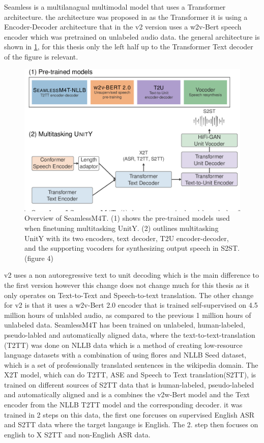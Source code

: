 Seamless is a multilanagual multimodal model that uses a Transformer architecture. 
the architecture was proposed in \cite{seamless2023}
as the Transformer it is using a Encoder-Decoder architecture that in the v2 version uses a w2v-Bert speech encoder which was pretrained on unlabeled audio data. 
the general architecture is shown in \ref{fig:seamlessmodel}, for this thesis only the left half up to the Transformer Text decoder of the figure is relevant. 

\begin{figure}
        \centering
        \includegraphics[width=0.5\linewidth]{Latex//sections/images/seamlessmodel.png}
        \caption{Overview of SeamlessM4T. (1) shows the pre-trained models used when finetuning multitasking UnitY. (2) outlines multitasking UnitY with its two encoders, text decoder, T2U encoder-decoder, and the supporting vocoders for synthesizing output speech in S2ST. \cite{seamless2023}(figure 4)}
        \label{fig:seamlessmodel}
\end{figure}
    
v2 uses a non autoregressive text to unit decoding which is the main difference to the first version however this change does not change much for this thesis as it only operates on Text-to-Text and Speech-to-text translation. 
The other change for v2 is that it uses a w2v-Bert 2.0 \cite{chung2021w2vbertcombiningcontrastivelearning} encoder that is trained self-supervised on 4.5 million hours of unlabled audio, as compared to the previous 1 million hours of unlabeled data. 
SeamlessM4T has been trained on unlabeled, human-labeled, pseudo-labled and automatically aligned data, where the text-to-text-translation (T2TT) was done on NLLB data \cite{nllbteam2022languageleftbehindscaling}
which is a method of creating low-resource language datasets with a combination of using flores \cite{guzmán2019floresevaluationdatasetslowresource} and NLLB Seed dataset, which is a set of professionally translated sentences in the wikipedia domain. 
The X2T model, which can do T2TT, ASE and Speech to Text translation(S2TT), is trained on different sources of S2TT data that is human-labeled, pseudo-labeled and automatically aligned and is a combines the v2w-Bert model and the Text encoder from the NLLB T2TT model and the corresponding decoder. it was trained in 2 steps on this data, the first one forcuses on supervised English ASR and S2TT data where the target langauge is English. The 2. step then focuses on english to X S2TT and non-English ASR data.


